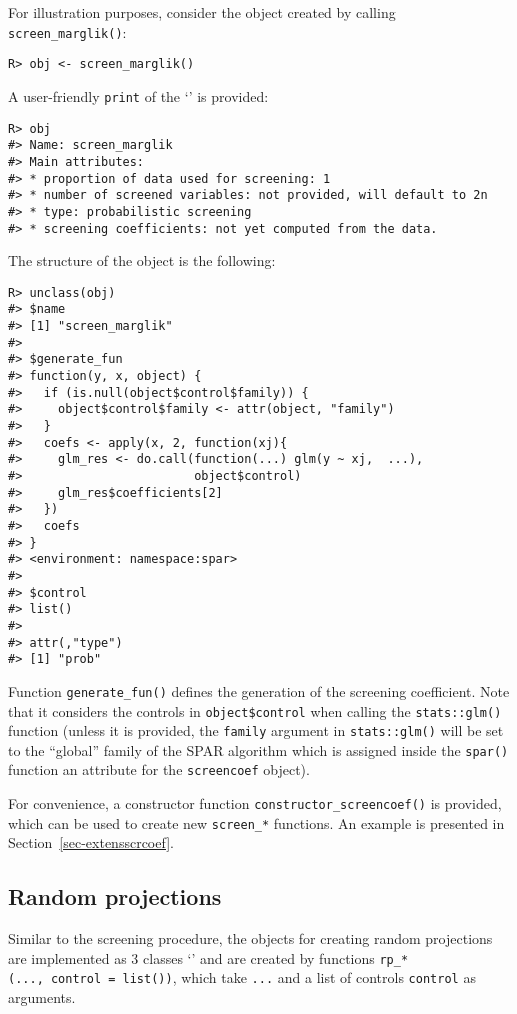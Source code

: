 \documentclass[
  article]{jss}
\newcommand{\class}[1]{`\code{#1}'}
\begin{document}
For illustration purposes, consider the object created by calling
\texttt{screen\_marglik()}:

\begin{verbatim}
R> obj <- screen_marglik()
\end{verbatim}

A user-friendly \texttt{print} of the \class{screencoef} is provided:

\begin{verbatim}
R> obj
#> Name: screen_marglik 
#> Main attributes: 
#> * proportion of data used for screening: 1 
#> * number of screened variables: not provided, will default to 2n 
#> * type: probabilistic screening 
#> * screening coefficients: not yet computed from the data.
\end{verbatim}

The structure of the object is the following:

\begin{verbatim}
R> unclass(obj)
#> $name
#> [1] "screen_marglik"
#> 
#> $generate_fun
#> function(y, x, object) {
#>   if (is.null(object$control$family)) {
#>     object$control$family <- attr(object, "family")
#>   }
#>   coefs <- apply(x, 2, function(xj){
#>     glm_res <- do.call(function(...) glm(y ~ xj,  ...),
#>                        object$control)
#>     glm_res$coefficients[2]
#>   })
#>   coefs
#> }
#> <environment: namespace:spar>
#> 
#> $control
#> list()
#> 
#> attr(,"type")
#> [1] "prob"
\end{verbatim}

Function \texttt{generate\_fun()} defines the generation of the
screening coefficient. Note that it considers the controls in
\texttt{object\$control} when calling the \texttt{stats::glm()} function
(unless it is provided, the \texttt{family} argument in
\texttt{stats::glm()} will be set to the ``global'' family of the SPAR
algorithm which is assigned inside the \texttt{spar()} function an
attribute for the \texttt{screencoef} object).

For convenience, a constructor function
\texttt{constructor\_screencoef()} is provided, which can be used to
create new \texttt{screen\_*} functions. An example is presented in
Section~\ref{sec-extensscrcoef}.

\subsection{Random projections}\label{random-projections}

Similar to the screening procedure, the objects for creating random
projections are implemented as 3 classes
\class{randomprojection} and are created by functions
\texttt{rp\_*(...,\ control\ =\ list())}, which take \texttt{...} and a
list of controls \texttt{control} as arguments.
\end{document}
